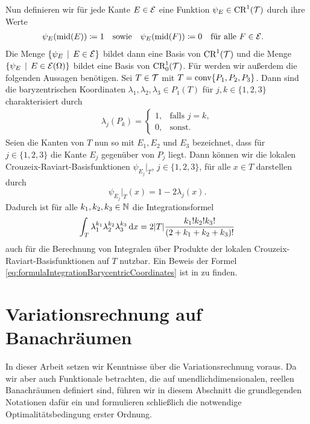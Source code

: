 Nun definieren wir für jede Kante $E\in\mathcal{E}$ eine Funktion
$\psi_E\in\textup{CR}^1(\mathcal{T})$ durch ihre Werte
\begin{align*}
  \psi_E(\textup{mid}(E))&\coloneqq 1 
  &&\text{sowie} 
  &\psi_E(\textup{mid}(F))&\coloneqq 0\quad\text{für alle } F\in\mathcal{E}.
\end{align*}
Die Menge $\{\psi_E\,\mid\,E\in\mathcal{E}\}$ bildet dann eine Basis von
$\textup{CR}^1(\mathcal{T})$ und die Menge
$\{\psi_E\,\mid\,E\in\mathcal{E}(\Omega)\}$ bildet eine Basis von
$\textup{CR}^1_0(\mathcal{T})$. 
Für  werden wir außerdem die folgenden Aussagen
benötigen.
Sei $T\in\mathcal{T}$ mit $T=\textup{conv}\{P_1,P_2,P_3\}$. 
Dann sind die baryzentrischen Koordinaten $\lambda_1,\lambda_2,\lambda_3\in
P_1(T)$ für $j,k\in\{1,2,3\}$ charakterisiert durch
\begin{align*}
  \lambda_j(P_k)
  =
  \begin{cases}
    1,&\text{falls }  j=k,\\
    0,&\text{sonst.}
  \end{cases}
\end{align*}
Seien die Kanten von $T$ nun so mit $E_1,E_2$ und $E_3$ bezeichnet, dass für
$j\in\{1,2,3\}$ die Kante $E_j$ gegenüber von $P_j$ liegt. 
Dann können wir die lokalen Crouzeix-Raviart-Basisfunktionen 
$\psi_{E_j}\!|_T$, $j\in\{1,2,3\}$, für alle $x\in T$ darstellen durch
\begin{equation}
  \label{eq:connectionCrBarycentric}
  \psi_{E_j}\!|_T(x)=1-2\lambda_j(x).
\end{equation}
Dadurch ist für alle $k_1,k_2,k_3\in\mathbb{N}$ die Integrationsformel
\begin{equation}
  \label{eq:formulaIntegrationBarycentricCoordinates}
  \int_T \lambda_1^{k_1}\lambda_2^{k_2}\lambda_3^{k_3}\,\mathrm{d}x
  =
  2|T|\frac{k_1!k_2!k_3!}{(2+k_1+k_2+k_3)!}
\end{equation}
auch für die Berechnung von Integralen über Produkte der lokalen
Crouzeix-Raviart-Basisfunktionen auf $T$ nutzbar. Ein Beweis der Formel
\eqref{eq:formulaIntegrationBarycentricCoordinates} ist in 
\cite{EM73} zu finden.


\section{Variationsrechnung auf Banachräumen}
\label{sec:variationalCalculus}

In dieser Arbeit setzen wir Kenntnisse über die Variationsrechnung voraus. 
Da wir aber auch Funktionale betrachten, die auf
unendlichdimensionalen, reellen Banachräumen definiert sind, führen
wir in diesem Abschnitt die grundlegenden Notationen dafür ein und formulieren
schließlich die notwendige Optimalitätsbedingung erster Ordnung.

